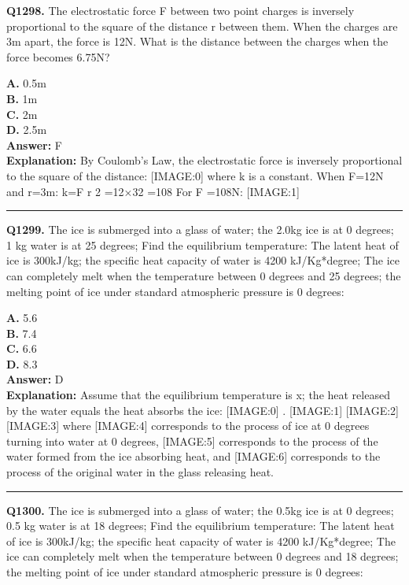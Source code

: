 \documentclass[12pt]{article}
\begin{document}
\noindent
\textbf{Q1298.} The electrostatic force F between two point charges is inversely proportional to the square of the distance r between them. When the charges are 3m apart, the force is 12N. What is the distance between the charges when the force becomes 6.75N?



\textbf{A.} 0.5m \\
\textbf{B.} 1m \\
\textbf{C.} 2m \\
\textbf{D.} 2.5m \\

\textbf{Answer:} F \\
\textbf{Explanation:} By Coulomb's Law, the electrostatic force is inversely proportional to the square of the distance:
[IMAGE:0]
where k is a constant. When F=12N and r=3m: k=F
\cdot 
r
2
=12×32 =108
For
F
=108N:
[IMAGE:1]

\hrule
\vspace{1em}


\noindent
\textbf{Q1299.} The ice is submerged into a glass of water; the 2.0kg ice is at 0 degrees; 1 kg water is at 25 degrees; Find the equilibrium temperature: The latent heat of ice is 300kJ/kg; the specific heat capacity of water is 4200 kJ/Kg*degree; The ice can completely melt when the temperature between 0 degrees and 25 degrees; the melting point of ice under standard atmospheric pressure is 0 degrees:



\textbf{A.} 5.6 \\
\textbf{B.} 7.4 \\
\textbf{C.} 6.6 \\
\textbf{D.} 8.3 \\

\textbf{Answer:} D \\
\textbf{Explanation:} Assume that the equilibrium temperature is x; the heat released by the water equals the heat absorbs the ice:
[IMAGE:0]
.
[IMAGE:1]
[IMAGE:2]
[IMAGE:3]
where
[IMAGE:4]
corresponds to the process of ice at 0 degrees turning into water at 0 degrees,
[IMAGE:5]
corresponds to the process of the water formed from the ice absorbing heat, and
[IMAGE:6]
corresponds to the process of the original water in the glass releasing heat.

\hrule
\vspace{1em}


\noindent
\textbf{Q1300.} The ice is submerged into a glass of water; the 0.5kg ice is at 0 degrees; 0.5 kg water is at 18 degrees; Find the equilibrium temperature: The latent heat of ice is 300kJ/kg; the specific heat capacity of water is 4200 kJ/Kg*degree; The ice can completely melt when the temperature between 0 degrees and 18 degrees; the melting point of ice under standard atmospheric pressure is 0 degrees:
\end{document}
